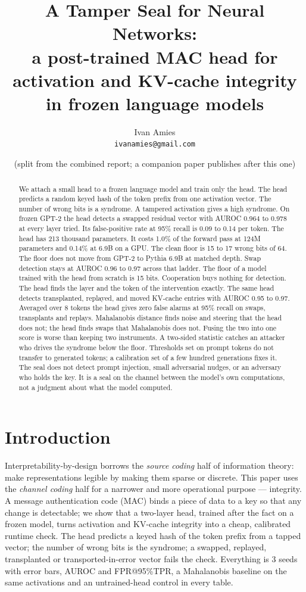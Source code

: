 \documentclass[10pt,twocolumn]{article}
\title{A Tamper Seal for Neural Networks:\\ \large a post-trained MAC head for activation and KV-cache integrity in frozen language models}
\author{Ivan Amies\\ \small \texttt{ivanamies@gmail.com}}
\date{(split from the combined report; a companion paper publishes after this one)}
\begin{document}
\maketitle

\begin{abstract}
We attach a small head to a frozen language model and train only the head.
The head predicts a random keyed hash of the token prefix from one activation vector.
The number of wrong bits is a syndrome.
A tampered activation gives a high syndrome.
On frozen GPT-2 the head detects a swapped residual vector with AUROC 0.964 to 0.978 at every layer tried.
Its false-positive rate at 95\% recall is 0.09 to 0.14 per token.
The head has 213 thousand parameters.
It costs 1.0\% of the forward pass at 124M parameters and 0.14\% at 6.9B on a GPU.
The clean floor is 15 to 17 wrong bits of 64.
The floor does not move from GPT-2 to Pythia 6.9B at matched depth.
Swap detection stays at AUROC 0.96 to 0.97 across that ladder.
The floor of a model trained with the head from scratch is 15 bits.
Cooperation buys nothing for detection.
The head finds the layer and the token of the intervention exactly.
The same head detects transplanted, replayed, and moved KV-cache entries with AUROC 0.95 to 0.97.
Averaged over 8 tokens the head gives zero false alarms at 95\% recall on swaps, transplants and replays.
Mahalanobis distance finds noise and steering that the head does not; the head finds swaps that Mahalanobis does not.
Fusing the two into one score is worse than keeping two instruments.
A two-sided statistic catches an attacker who drives the syndrome below the floor.
Thresholds set on prompt tokens do not transfer to generated tokens; a calibration set of a few hundred generations fixes it.
The seal does not detect prompt injection, small adversarial nudges, or an adversary who holds the key.
It is a seal on the channel between the model's own computations, not a judgment about what the model computed.
\end{abstract}

\section{Introduction}
Interpretability-by-design borrows the \emph{source coding} half of information
theory: make representations legible by making them sparse or discrete. This paper
uses the \emph{channel coding} half for a narrower and more operational purpose ---
integrity. A message authentication code (MAC) binds a piece of data to a key so
that any change is detectable; we show that a two-layer head, trained after the fact
on a frozen model, turns activation and KV-cache integrity into a cheap, calibrated
runtime check. The head predicts a keyed hash of the token prefix from a tapped
vector; the number of wrong bits is the syndrome; a swapped, replayed, transplanted
or transported-in-error vector fails the check. Everything is 3 seeds with error bars,
AUROC and FPR@95\%TPR, a Mahalanobis baseline on the same activations and an
untrained-head control in every table.
\end{document}
